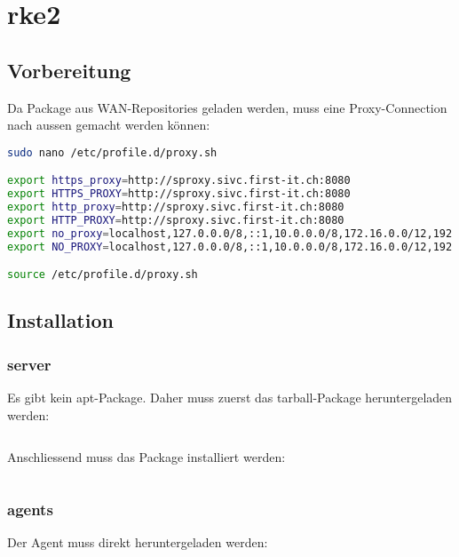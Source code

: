 
\section{rke2}
\subsection{Vorbereitung}
Da Package aus WAN-Repositories geladen werden, muss eine Proxy-Connection nach aussen gemacht werden können:
\lstset{style=gra_codestyle}
\begin{lstlisting}[language=bash, caption=Proxy Settings,captionpos=b,label={lst:proxy-settings},breaklines=true]
sudo nano /etc/profile.d/proxy.sh

export https_proxy=http://sproxy.sivc.first-it.ch:8080
export HTTPS_PROXY=http://sproxy.sivc.first-it.ch:8080
export http_proxy=http://sproxy.sivc.first-it.ch:8080
export HTTP_PROXY=http://sproxy.sivc.first-it.ch:8080
export no_proxy=localhost,127.0.0.0/8,::1,10.0.0.0/8,172.16.0.0/12,192.168.0.0/16
export NO_PROXY=localhost,127.0.0.0/8,::1,10.0.0.0/8,172.16.0.0/12,192.168.0.0/16

source /etc/profile.d/proxy.sh
\end{lstlisting}

\subsection{Installation}
\subsubsection{server}
Es gibt kein apt-Package.
Daher muss zuerst das tarball-Package heruntergeladen werden:
\lstset{style=gra_codestyle}
\begin{lstlisting}[language=bash, caption=Downlaod rke2 server,captionpos=b,label={lst:download-rke2-server},breaklines=true]

\end{lstlisting}
Anschliessend muss das Package installiert werden:
\lstset{style=gra_codestyle}
\begin{lstlisting}[language=bash, caption=rke2 server installieren,captionpos=b,label={lst:install-rke2-server},breaklines=true]

\end{lstlisting}

\subsubsection{agents}
Der Agent muss direkt heruntergeladen werden:
\lstset{style=gra_codestyle}
\begin{lstlisting}[language=bash, caption=Downlaod rke2 agent,captionpos=b,label={lst:download-rke2-agent},breaklines=true]

\end{lstlisting}

